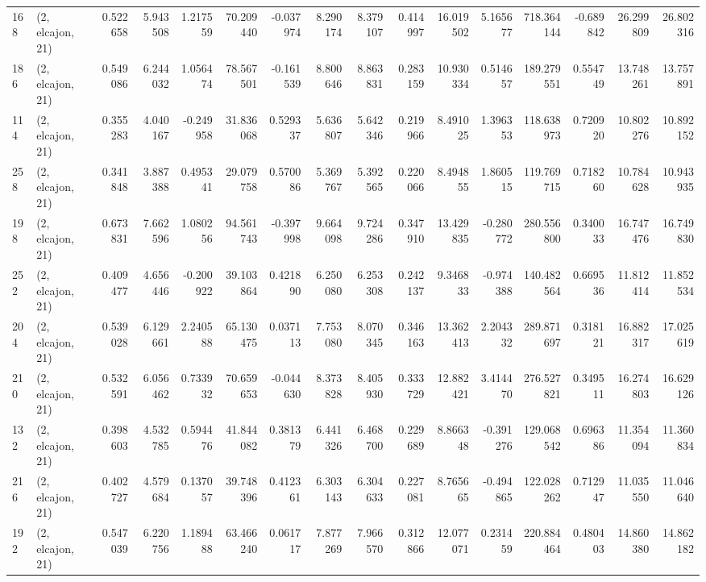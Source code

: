 \begin{tabular}{llrrrrrrrrrrrrrr}
168 &  (2, elcajon, 21) &   0.522658 &   5.943508 &   1.217559 &    70.209440 &  -0.037974 &   8.290174 &   8.379107 &  0.414997 &  16.019502 &   5.165677 &   718.364144 & -0.689842 &  26.299809 &  26.802316 \\
186 &  (2, elcajon, 21) &   0.549086 &   6.244032 &   1.056474 &    78.567501 &  -0.161539 &   8.800646 &   8.863831 &  0.283159 &  10.930334 &   0.514657 &   189.279551 &  0.554749 &  13.748261 &  13.757891 \\
114 &  (2, elcajon, 21) &   0.355283 &   4.040167 &  -0.249958 &    31.836068 &   0.529337 &   5.636807 &   5.642346 &  0.219966 &   8.491025 &   1.396353 &   118.638973 &  0.720920 &  10.802276 &  10.892152 \\
258 &  (2, elcajon, 21) &   0.341848 &   3.887388 &   0.495341 &    29.079758 &   0.570086 &   5.369767 &   5.392565 &  0.220066 &   8.494855 &   1.860515 &   119.769715 &  0.718260 &  10.784628 &  10.943935 \\
198 &  (2, elcajon, 21) &   0.673831 &   7.662596 &   1.080256 &    94.561743 &  -0.397998 &   9.664098 &   9.724286 &  0.347910 &  13.429835 &  -0.280772 &   280.556800 &  0.340033 &  16.747476 &  16.749830 \\
252 &  (2, elcajon, 21) &   0.409477 &   4.656446 &  -0.200922 &    39.103864 &   0.421890 &   6.250080 &   6.253308 &  0.242137 &   9.346833 &  -0.974388 &   140.482564 &  0.669536 &  11.812414 &  11.852534 \\
204 &  (2, elcajon, 21) &   0.539028 &   6.129661 &   2.240588 &    65.130475 &   0.037113 &   7.753080 &   8.070345 &  0.346163 &  13.362413 &   2.204332 &   289.871697 &  0.318121 &  16.882317 &  17.025619 \\
210 &  (2, elcajon, 21) &   0.532591 &   6.056462 &   0.733932 &    70.659653 &  -0.044630 &   8.373828 &   8.405930 &  0.333729 &  12.882421 &   3.414470 &   276.527821 &  0.349511 &  16.274803 &  16.629126 \\
132 &  (2, elcajon, 21) &   0.398603 &   4.532785 &   0.594476 &    41.844082 &   0.381379 &   6.441326 &   6.468700 &  0.229689 &   8.866348 &  -0.391276 &   129.068542 &  0.696386 &  11.354094 &  11.360834 \\
216 &  (2, elcajon, 21) &   0.402727 &   4.579684 &   0.137057 &    39.748396 &   0.412361 &   6.303143 &   6.304633 &  0.227081 &   8.765665 &  -0.494865 &   122.028262 &  0.712947 &  11.035550 &  11.046640 \\
192 &  (2, elcajon, 21) &   0.547039 &   6.220756 &   1.189488 &    63.466240 &   0.061717 &   7.877269 &   7.966570 &  0.312866 &  12.077071 &   0.231459 &   220.884464 &  0.480403 &  14.860380 &  14.862182 \\

\end{tabular}
